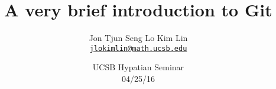 \title{\bf A very brief introduction to Git
}

\author{
  Jon Tjun Seng Lo Kim Lin \\
  \href{mailto:jlokimlin@math.ucsb.edu}{\tt jlokimlin@math.ucsb.edu}
}

\date{
  UCSB Hypatian Seminar\\
  04/25/16
}

\begin{frame}
  \maketitle
\end{frame}
